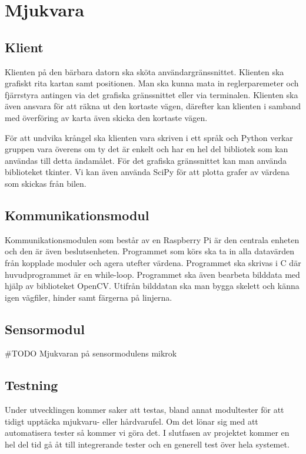 \documentclass[systemskiss/skiss.tex]{subfiles}
\begin{document}
\section{Mjukvara}
\subsection{Klient}
Klienten på den bärbara datorn ska sköta användargränssnittet. Klienten ska
grafiskt rita kartan samt positionen. Man ska kunna mata in reglerparemeter och
fjärrstyra antingen via det grafiska gränssnittet eller via terminalen.
Klienten ska även ansvara för att räkna ut den kortaste vägen, därefter kan
klienten i samband med överföring av karta även skicka den kortaste vägen.

För att undvika krångel ska klienten vara skriven i ett språk och Python verkar
gruppen vara överens om ty det är enkelt och har en hel del bibliotek som kan
användas till detta ändamålet. För det grafiska gränssnittet kan man använda
biblioteket tkinter. Vi kan även använda SciPy för att plotta grafer av värdena
som skickas från bilen.

\subsection{Kommunikationsmodul}
Kommunikationsmodulen som består av en Raspberry Pi är den centrala enheten och
den är även beslutsenheten. Programmet som körs ska ta in alla datavärden från
kopplade moduler och agera utefter värdena. Programmet ska skrivas i C där
huvudprogrammet är en while-loop. Programmet ska även bearbeta bilddata med
hjälp av biblioteket OpenCV. Utifrån bilddatan ska man bygga skelett och känna
igen vägfiler, hinder samt färgerna på linjerna.  

\subsection{Sensormodul}
#TODO Mjukvaran på sensormodulens mikrok

\subsection{Testning}
Under utvecklingen kommer saker att testas, bland annat modultester för att
tidigt upptäcka mjukvaru- eller hårdvarufel. Om det lönar sig med att
automatisera tester så kommer vi göra det. I slutfasen av projektet kommer en
hel del tid gå åt till integrerande tester och en generell test över hela
systemet.
\end{document}
